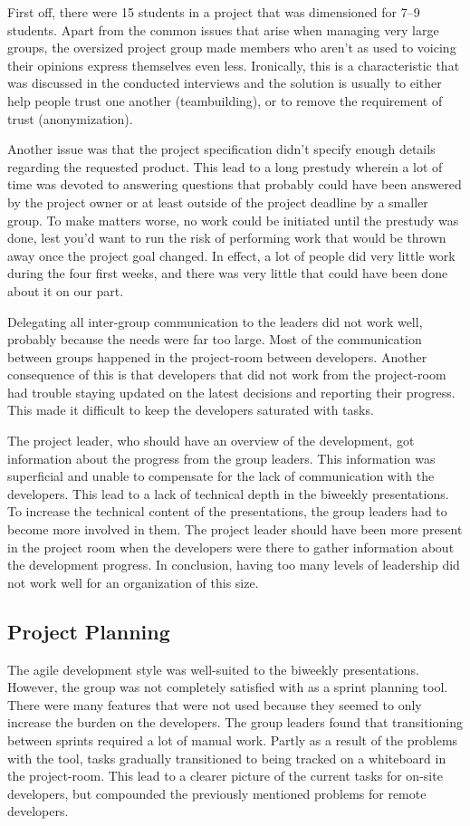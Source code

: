 First off, there were 15 students in a project that was dimensioned for 7--9 students. Apart from the common issues that arise when managing very large groups, the oversized project group made members who aren't as used to voicing their opinions express themselves even less. Ironically, this is a characteristic that was discussed in the conducted interviews and the solution is usually to either help people trust one another (teambuilding), or to remove the requirement of trust (anonymization). 

Another issue was that the project specification didn't specify enough details regarding the requested product. This lead to a long prestudy wherein a lot of time was devoted to answering questions that probably could have been answered by the project owner or at least outside of the project deadline by a smaller group. To make matters worse, no work could be initiated until the prestudy was done, lest you'd want to run the risk of performing work that would be thrown away once the project goal changed. In effect, a lot of people did very little work during the four first weeks, and there was very little that could have been done about it on our part.

Delegating all inter-group communication to the leaders did not work well, probably because the needs were far too large. Most of the communication between groups happened in the project-room between developers. Another consequence of this is that developers that did not work from the project-room had trouble staying updated on the latest decisions and reporting their progress. This made it difficult to keep the developers saturated with tasks.

The project leader, who should have an overview of the development, got information about the progress from the group leaders. This information was superficial and unable to compensate for the lack of communication with the developers. This lead to a lack of technical depth in the biweekly presentations. To increase the technical content of the presentations, the group leaders had to become more involved in them. The project leader should have been more present in the project room when the developers were there to gather information about the development progress. In conclusion, having too many levels of leadership did not work well for an organization of this size.

\subsection{Project Planning}
The agile development style was well-suited to the biweekly presentations. However, the group was not completely satisfied with \taiga{} as a sprint planning tool. There were many features that were not used because they seemed to only increase the burden on the developers. The group leaders found that transitioning between sprints required a lot of manual work. Partly as a result of the problems with the tool, tasks gradually transitioned to being tracked on a whiteboard in the project-room. This lead to a clearer picture of the current tasks for on-site developers, but compounded the previously mentioned problems for remote developers.
